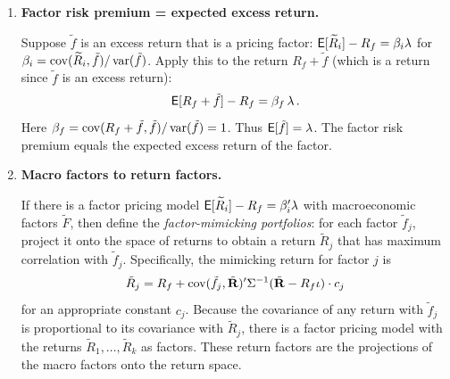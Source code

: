 \begin{enumerate}
We need $\mye[\tm]=1/R_f$ and $\mye[\tm\tilde{R}_m]=1$.  These give:
\begin{align*}
a - b\,\mye[\tilde{R}_m] &= \frac{1}{R_f}\,,\\
a\,\mye[\tilde{R}_m] - b\,\mye[\tilde{R}_m^2] &= 1\,.
\end{align*}
From the first equation, $a = 1/R_f + b\,\mye[\tilde{R}_m]$.  Substituting into the second:
\begin{align*}
\left(\frac{1}{R_f}+b\,\mye[\tilde{R}_m]\right)\mye[\tilde{R}_m] - b\,\mye[\tilde{R}_m^2] &= 1\\
\frac{\mye[\tilde{R}_m]}{R_f} - b\,\var(\tilde{R}_m) &= 1\,.
\end{align*}
Hence,
\[
b = \frac{\mye[\tilde{R}_m]/R_f - 1}{\var(\tilde{R}_m)} = \frac{\mye[\tilde{R}_m]-R_f}{R_f\,\var(\tilde{R}_m)}\,,
\]
and
\[
a = \frac{1}{R_f} + \frac{\mye[\tilde{R}_m]-R_f}{R_f\,\var(\tilde{R}_m)}\,\mye[\tilde{R}_m] = \frac{1}{R_f}\left(1 + \frac{\mye[\tilde{R}_m](\mye[\tilde{R}_m]-R_f)}{\var(\tilde{R}_m)}\right).
\]

\item \textbf{Factor risk premium = expected excess return.}

Suppose $\tilde{f}$ is an excess return that is a pricing factor: $\mathsf{E}[\widetilde{R}_i]-R_f = \beta_i\lambda$ for $\beta_i = \operatorname{cov}(\widetilde{R}_i,\tilde{f})/\operatorname{var}(\tilde{f})$.  Apply this to the return $R_f + \tilde{f}$ (which is a return since $\tilde{f}$ is an excess return):
\[
\mathsf{E}[R_f + \tilde{f}] - R_f = \beta_f\,\lambda\,.
\]
Here $\beta_f = \operatorname{cov}(R_f+\tilde{f},\tilde{f})/\operatorname{var}(\tilde{f}) = 1$.  Thus $\mathsf{E}[\tilde{f}] = \lambda$.  The factor risk premium equals the expected excess return of the factor.

\item \textbf{Macro factors to return factors.}

If there is a factor pricing model $\mathsf{E}[\widetilde{R}_i]-R_f = \beta_i'\lambda$ with macroeconomic factors $\tilde{F}$, then define the \emph{factor-mimicking portfolios}: for each factor $\tilde{f}_j$, project it onto the space of returns to obtain a return $\tilde{R}_j$ that has maximum correlation with $\tilde{f}_j$.  Specifically, the mimicking return for factor $j$ is
\[
\tilde{R}_j = R_f + \operatorname{cov}(\tilde{f}_j,\tilde{\mathbf{R}})'\Sigma^{-1}(\tilde{\mathbf{R}}-R_f\iota)\cdot c_j
\]
for an appropriate constant $c_j$.  Because the covariance of any return with $\tilde{f}_j$ is proportional to its covariance with $\tilde{R}_j$, there is a factor pricing model with the returns $\tilde{R}_1,\ldots,\tilde{R}_k$ as factors.  These return factors are the projections of the macro factors onto the return space.


\end{enumerate}
